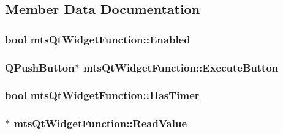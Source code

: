 \subsection{Member Data Documentation}
\hypertarget{classmts_qt_widget_function_af20ae57edf9ba7c3404b00eb3fcee728}{
\subsubsection[{Enabled}]{\setlength{\rightskip}{0pt plus 5cm}bool mts\-Qt\-Widget\-Function\-::\-Enabled\hspace{0.3cm}{\ttfamily [protected]}}}\label{classmts_qt_widget_function_af20ae57edf9ba7c3404b00eb3fcee728}
\hypertarget{classmts_qt_widget_function_ade106b082a43dd9521e2d337d6eaed4d}{
\subsubsection[{Execute\-Button}]{\setlength{\rightskip}{0pt plus 5cm}Q\-Push\-Button$\ast$ mts\-Qt\-Widget\-Function\-::\-Execute\-Button\hspace{0.3cm}{\ttfamily [protected]}}}\label{classmts_qt_widget_function_ade106b082a43dd9521e2d337d6eaed4d}
\hypertarget{classmts_qt_widget_function_a0dd74f0d0cec1225c98c06c8ee231b12}{
\subsubsection[{Has\-Timer}]{\setlength{\rightskip}{0pt plus 5cm}bool mts\-Qt\-Widget\-Function\-::\-Has\-Timer\hspace{0.3cm}{\ttfamily [protected]}}}\label{classmts_qt_widget_function_a0dd74f0d0cec1225c98c06c8ee231b12}
\hypertarget{classmts_qt_widget_function_a8aaeaa7548a0418ec88d948e01155403}{
\subsubsection[{Read\-Value}]{$\ast$ mts\-Qt\-Widget\-Function\-::\-Read\-Value\hspace{0.3cm}{\ttfamily [protected]}}}\label{classmts_qt_widget_function_a8aaeaa7548a0418ec88d948e01155403}
